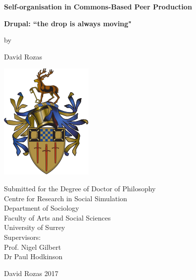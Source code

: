 \thispagestyle{empty}
\begin{center}
\begin{minipage}{0.95\textwidth}
    \centering
    {\huge \textbf{Self-organisation in Commons-Based  Peer Production}\par}
    \vspace{0.5cm}
    {\Large \textbf{Drupal: ``the drop is always moving"}\par}
    \vspace{0.75cm}
    {\Large by\par}
    \vspace{0.75cm}
    {\Large David Rozas\par}
    \vspace{1.5cm}
    
    \includegraphics[width=0.3\linewidth]{img/surrey_logo.png}
    \vspace{2cm}
   
 {\large 
                    Submitted for the Degree of Doctor of Philosophy \\
                    \vspace{0.5cm}
 					Centre for Research in Social Simulation \\
					Department of Sociology\\
					Faculty of Arts and Social Sciences\\
					University of Surrey\\}
   \vspace{1cm}
    {\large Supervisors: \\
					Prof. Nigel Gilbert\\
					Dr Paul Hodkinson\\
	}

    \vspace{1cm}  
    \vspace{0.5cm} 
    {\small {\scriptsize {}} David Rozas 2017}
\end{minipage}
\end{center}
\clearpage